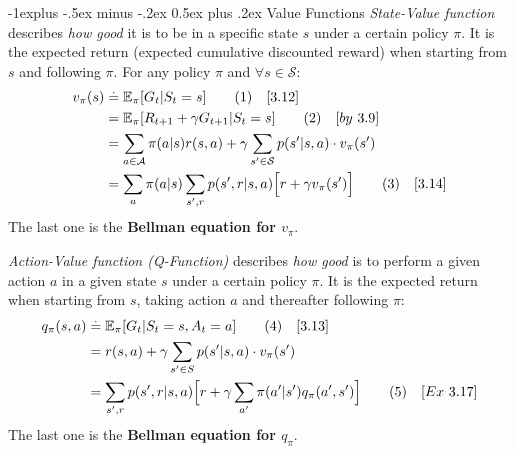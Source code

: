 \documentclass[10pt,landscape]{article}
\makeatletter
\renewcommand{\subsection}{\@startsection{subsection}{2}{0mm}%
                                {-1explus -.5ex minus -.2ex}%
                                {0.5ex plus .2ex}%
                                {\normalfont\normalsize\bfseries}}
\newcommand\numberthis{\addtocounter{equation}{1}\tag{\theequation}}
\makeatother
\begin{document}
\begin{multicols}{3}
\subsection{Value Functions}
\emph{State-Value function} describes \emph{how good} it is to be in a specific state $s$ under a certain policy $\pi$.
It is the expected return (expected cumulative discounted reward) when starting from $s$ and following $\pi$. For any policy $\pi$ and $\forall s \in \mathcal{S}$:
\begin{align*}
v_{\pi}(s) & \stackrel{.}{=} \mathbb{E}_{\pi}[G_t | S_t = s] \numberthis \label{eq:v_def} \quad [3.12] \\
& = \mathbb{E}_{\pi}[R_{t+1} + \gamma G_{t+1} | S_t = s] \numberthis  \quad [by \ 3.9] \\ 
& = \sum_{a \in \mathcal{A}} \pi(a|s) r(s,a) + \gamma \sum_{s' \in \mathcal{S}} p(s'|s,a) \cdot v_\pi (s') \\
& = \sum_{a} \pi(a|s) \sum_{s' ,r} p(s',r | s, a) \Big[r + \gamma v_{\pi}(s')\Big] \numberthis \label{eq:v_bellman} \quad [3.14]
\end{align*}
The last one is the \textbf{Bellman equation for $v_\pi$}.

\emph{Action-Value function (Q-Function)} describes \emph{how good} is to perform a given action $a$ in a given state $s$ under a certain policy $\pi$. It is the expected return when starting from $s$, taking action $a$ and thereafter following $\pi$:
\begin{align*}
q_{\pi}(s,a) & \stackrel{.}{=} \mathbb{E}_{\pi}[G_t | S_t = s, A_t = a]  \numberthis \label{eq:q_def}\quad [3.13] \\
& = r(s,a) + \gamma \sum_{s' \in S} p(s'|s,a) \cdot v_\pi (s')\\
& = \sum_{s',r} p(s',r|s,a) \Big[r + \gamma \sum_{a'} \pi(a'|s') q_{\pi}(a',s') \Big]  \numberthis \label{eq:q_bellman}\quad [Ex \ 3.17]
\end{align*}
The last one is the \textbf{Bellman equation for $q_\pi$}.


\end{multicols}
\end{document}
